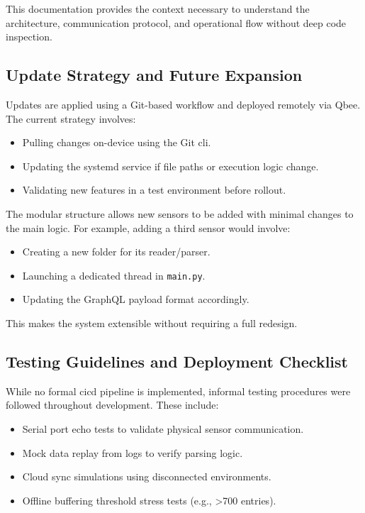 This documentation provides the context necessary to understand the architecture, communication protocol, and operational flow without deep code inspection.


\subsection{Update Strategy and Future Expansion}

Updates are applied using a Git-based workflow and deployed remotely via Qbee. The current strategy involves:
\begin{itemize}
    \item Pulling changes on-device using the Git \acrshort{cli}.
    \item Updating the systemd service if file paths or execution logic change.
    \item Validating new features in a test environment before rollout.
\end{itemize}

The modular structure allows new sensors to be added with minimal changes to the main logic. For example, adding a third sensor would involve:
\begin{itemize}
    \item Creating a new folder for its reader/parser.
    \item Launching a dedicated thread in \texttt{main.py}.
    \item Updating the GraphQL payload format accordingly.
\end{itemize}

This makes the system extensible without requiring a full redesign.


\subsection{Testing Guidelines and Deployment Checklist}

While no formal \acrshort{cicd} pipeline is implemented, informal testing procedures were followed throughout development. These include:
\begin{itemize}
    \item Serial port echo tests to validate physical sensor communication.
    \item Mock data replay from logs to verify parsing logic.
    \item Cloud sync simulations using disconnected environments.
    \item Offline buffering threshold stress tests (e.g., >700 entries).
\end{itemize}

